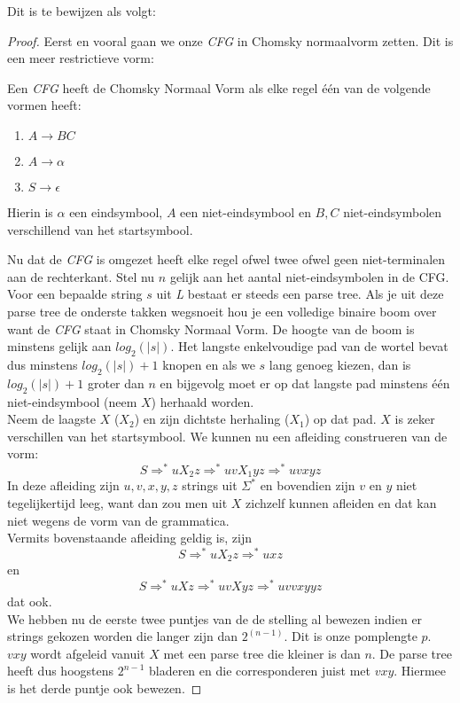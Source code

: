 Dit is te bewijzen als volgt:
\begin{proof}
Eerst en vooral gaan we onze \emph{CFG} in Chomsky normaalvorm zetten. Dit is een meer restrictieve vorm:
\begin{theorem}
Een \emph{CFG} heeft de Chomsky Normaal Vorm als elke regel \'e\'en van de volgende vormen heeft:
\begin{enumerate}
\item $A \rightarrow BC$
\item $A \rightarrow \alpha$
\item $S \rightarrow \epsilon$
\end{enumerate}
Hierin is $\alpha$ een eindsymbool, $A$ een niet-eindsymbool en $B,C$ niet-eindsymbolen verschillend van het startsymbool.
\end{theorem}
Nu dat de \emph{CFG} is omgezet heeft elke regel ofwel twee ofwel geen niet-terminalen aan de rechterkant. Stel nu $n$ gelijk aan het aantal niet-eindsymbolen in de CFG.\\[0.5cm]

Voor een bepaalde string $s$ uit \emph{L} bestaat er steeds een parse tree. Als je uit deze parse tree de onderste takken wegsnoeit hou je een volledige binaire boom over want de \emph{CFG} staat in Chomsky Normaal Vorm. De hoogte van de boom is minstens gelijk aan $log_2(|s|)$. Het langste enkelvoudige pad van de wortel bevat dus minstens $log_2(|s|)+1$ knopen en als we $s$ lang genoeg kiezen, dan is $log_2(|s|)+1$ groter dan $n$ en bijgevolg moet er op dat langste pad minstens \'e\'en niet-eindsymbool (neem $X$) herhaald worden.\\[0.5cm]

Neem de laagste $X$ ($X_2$) en zijn dichtste herhaling ($X_1$) op dat pad. $X$ is zeker verschillen van het startsymbool. We kunnen nu een afleiding construeren van de vorm:
$$ S \Rightarrow^* u X_2 z \Rightarrow^* u v X_1 y z \Rightarrow^* uvxyz  $$
In deze afleiding zijn $u,v,x,y,z$ strings uit $\Sigma^*$ en bovendien zijn $v$ en $y$ niet tegelijkertijd leeg, want dan zou men uit $X$ zichzelf kunnen afleiden en dat kan niet wegens de vorm van de grammatica. \\[0.5cm]

Vermits bovenstaande afleiding geldig is, zijn
$$ S \Rightarrow^* u X_2 z \Rightarrow^* u x z  $$
en
$$ S \Rightarrow^* u X z \Rightarrow^* u v X y z \Rightarrow^* u v v x y y z  $$
dat ook. \\[0.5cm]

We hebben nu de eerste twee puntjes van de de stelling al bewezen indien er strings gekozen worden die langer zijn dan $2^{(n-1)}$. Dit is onze pomplengte $p$. $vxy$ wordt afgeleid vanuit $X$ met een parse tree die kleiner is dan $n$. De parse tree heeft dus hoogstens $2^{n-1}$ bladeren en die corresponderen juist met $vxy$. Hiermee is het derde puntje ook bewezen.

\end{proof}
